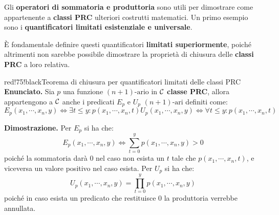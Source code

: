 Gli \textbf{operatori di sommatoria e produttoria} sono utili per dimostrare come appartenente a \textbf{classi PRC} ulteriori costrutti matematici.
Un primo esempio sono i \textbf{quantificatori limitati esistenziale e universale}.

\newpage


È fondamentale definire questi quantificatori \textbf{limitati superiormente}, poiché altrimenti non sarebbe possibile dimostrare la proprietà di chiusura delle \textbf{classi PRC} a loro relativa.

\begin{halfframedbox}{red!75!black}{Teorema di chiusura per quantificatori limitati delle classi PRC}\label{Teorema di chiusura per quantificatori limitati delle classi PRC}
  \textbf{Enunciato. } Sia \(p\) una funzione \((n+1)\text{-ario}\) in \(\mathcal{C}\) \textbf{classe PRC}, allora appartengono a \(\mathcal{C}\) anche i predicati \(E_p\) e \(U_p\) \((n+1)\text{-ari}\) definiti come:
  \begin{equation}
    E_p(x_1,\cdots,x_n,y)\iff \exists t \leq y: p(x_1,\cdots,x_n,t)
    U_p(x_1,\cdots,x_n,y)\iff \forall t \leq y: p(x_1,\cdots,x_n,t)
  \end{equation}

  \begin{center}
    \textcolor{red!75!black}{\hdashrule[0.5ex]{18cm}{1pt}{3mm 3pt 1mm 2pt}}
  \end{center}

  \textbf{Dimostrazione. }  Per \(E_p\) si ha che:
  \begin{equation}
    E_p(x_1,\cdots,x_n,y)\iff\sum_{t=0}^y p(x_1,\cdots,x_n,y)> 0
  \end{equation}
  poiché la sommatoria darà \(0\) nel caso non esista un \(t\) tale che \(p(x_1,\cdots,x_n,t)\), e viceversa un valore positivo nel caso esista.
  Per \(U_p\) si ha che:
  \begin{equation}
    U_p(x_1,\cdots,x_n,y)=\prod_{t=0}^y p(x_1,\cdots,x_n,y)
  \end{equation}
  poiché in caso esista un predicato che restituisce \(0\) la produttoria verrebbe annullata.
\end{halfframedbox}

